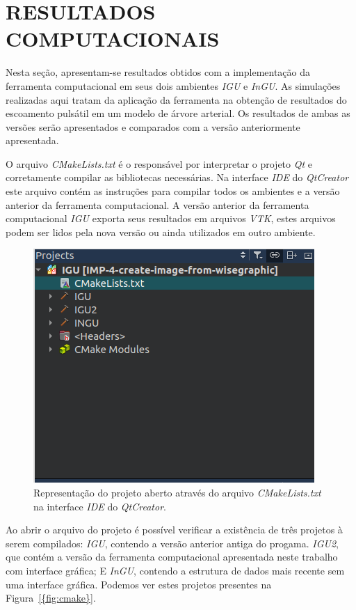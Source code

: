 \chapter{RESULTADOS COMPUTACIONAIS}\label{sec:resultados2}

Nesta seção, apresentam-se resultados obtidos com a implementação da ferramenta computacional em seus dois ambientes \textit{IGU} e \textit{InGU}. As simulações realizadas aqui tratam da aplicação da ferramenta na obtenção de resultados do escoamento pulsátil em um modelo de árvore arterial. Os resultados de ambas as versões serão apresentados e comparados com a versão anteriormente apresentada.

O arquivo \textit{CMakeLists.txt} é o responsável por interpretar o projeto \textit{Qt} e corretamente compilar as bibliotecas necessárias. Na interface \textit{IDE} do \textit{QtCreator} este arquivo contém as instruções para compilar todos os ambientes e a versão anterior da ferramenta computacional. A versão anterior da ferramenta computacional \textit{IGU} exporta seus resultados em arquivos \textit{VTK}, estes arquivos podem ser lidos pela nova versão ou ainda utilizados em outro ambiente.


\begin{figure}[!htbp]
	\centering
	\includegraphics[scale=1.5]{Figures/cmake_print.png}
	\caption{Representação do projeto aberto através do arquivo \textit{CMakeLists.txt} na interface \textit{IDE} do \textit{QtCreator}.}
	\label{fig:cmake}
\end{figure}


Ao abrir o arquivo do projeto é possível verificar a existência de três projetos à serem compilados: \textit{IGU}, contendo a versão anterior antiga do progama. \textit{IGU2}, que contém a versão da ferramenta computacional apresentada neste trabalho com interface gráfica; E \textit{InGU}, contendo a estrutura de dados mais recente sem uma interface gráfica. Podemos ver estes projetos presentes na Figura~\ref{{fig:cmake}}.

